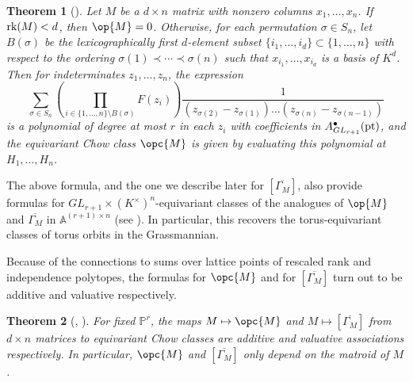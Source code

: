 \documentclass[12pt]{amsart}
\newcommand{\mb}{\mathbb}
\newcommand{\ol}{\overline}
\newcommand{\pt}{{\rm pt}}
\newcommand{\rk}{{\rm rk}}
\theoremstyle{plain}
\newtheorem{Thm*}{Theorem}
\theoremstyle{definition}
\theoremstyle{remark}
\begin{document}
\begin{Thm*}[] \label{finkformulaintro}
Let $M$ be a $d \times n$ matrix with nonzero columns $x_1,\ldots, x_n$. If $\rk(M) < d$, then $\op{M} = 0$. Otherwise, for each permutation $\sigma\in S_n$, let $B(\sigma)$ be the lexicographically first $d$-element subset $\{i_1,\ldots, i_d\} \subset \{1,\ldots,n\}$ with respect to the ordering $\sigma(1)\prec \cdots\prec\sigma(n)$ such that $x_{i_1},\ldots,x_{i_d}$ is a basis of $K^d$. Then for indeterminates $z_1,\ldots,z_n$, the expression $$\sum_{\sigma \in S_n} \left(\prod_{i \in \{1,\ldots,n\}\setminus B(\sigma)} F(z_i)\right)\frac{1}{(z_{\sigma(2)}-z_{\sigma(1)})\ldots (z_{\sigma(n)}-z_{\sigma(n-1)})}$$ is a polynomial of degree at most $r$ in each $z_i$ with coefficients in $A^{\bullet}_{GL_{r+1}}(\pt)$, and the equivariant Chow class $\opc{M}$ is given by evaluating this polynomial at $H_1,\ldots,H_n$.\end{Thm*}

The above formula, and the one we describe later for $[\overline{\Gamma_M}]$, also provide formulas for $GL_{r+1}\times (K^\times)^n$-equivariant classes of the analogues of $\op{M}$ and $\ol{\Gamma_M}$ in $\mb{A}^{(r+1)\times n}$ (see ). In particular, this recovers the torus-equivariant classes of torus orbits in the Grassmannian. 


Because of the connections to sums over lattice points of rescaled rank and independence polytopes, the formulas for $\opc{M}$ and for $[\overline{\Gamma_M}]$ turn out to be additive and valuative respectively.

\begin{Thm*}[, ]
\label{realvalintro}
For fixed $\mb{P}^r$, the maps $M \mapsto \opc{M}$  and $M \mapsto [\ol{\Gamma_M}]$ from $d \times n$ matrices to equivariant Chow classes
are additive and valuative associations respectively. In particular, $\opc{M}$ and $[\overline{\Gamma_M}]$ only depend on the matroid of $M$.
\end{Thm*}

\end{document}
